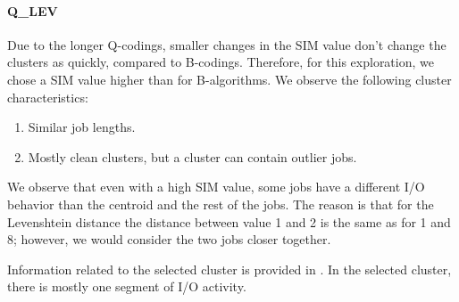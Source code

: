 \documentclass{jhps}
\begin{document}
\FloatBarrier
\paragraph{Q\_LEV}
Due to the longer Q-codings, smaller changes in the SIM value don't change the clusters as quickly, compared to B-codings.
Therefore, for this exploration, we chose a SIM value higher than for B-algorithms.
We observe the following cluster characteristics:
\begin{enumerate}
 \item Similar job lengths.
 \item Mostly clean clusters, but a cluster can contain outlier jobs.
\end{enumerate}

We observe that even with a high SIM value, some jobs have a different I/O behavior than the centroid and the rest of the jobs.
The reason is that for the Levenshtein distance the distance between value 1 and 2 is the same as for 1 and 8; however, we would consider the two jobs closer together.

Information related to the selected cluster is provided in .
In the selected cluster, there is mostly one segment of I/O activity.
\end{document}

